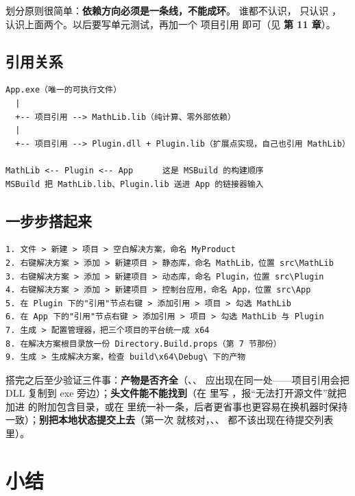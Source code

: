 {{划分原则很简单：\textbf{依赖方向必须是一条线，不能成环}。 谁都不认识， 只认识 ， 认识上面两个。以后要写单元测试，再加一个  项目引用  即可（见 \textbf{第 11 章}）。

\subsection{引用关系}

\begin{lstlisting}[style=textstyle]
App.exe（唯一的可执行文件）
  |
  +-- 项目引用 --> MathLib.lib（纯计算、零外部依赖）
  |
  +-- 项目引用 --> Plugin.dll + Plugin.lib（扩展点实现，自己也引用 MathLib）

MathLib <-- Plugin <-- App      这是 MSBuild 的构建顺序
MSBuild 把 MathLib.lib、Plugin.lib 送进 App 的链接器输入
\end{lstlisting}

\subsection{一步步搭起来}

\begin{lstlisting}[style=textstyle]
1. 文件 > 新建 > 项目 > 空白解决方案，命名 MyProduct
2. 右键解决方案 > 添加 > 新建项目 > 静态库，命名 MathLib，位置 src\MathLib
3. 右键解决方案 > 添加 > 新建项目 > 动态库，命名 Plugin，位置 src\Plugin
4. 右键解决方案 > 添加 > 新建项目 > 控制台应用，命名 App，位置 src\App
5. 在 Plugin 下的"引用"节点右键 > 添加引用 > 项目 > 勾选 MathLib
6. 在 App 下的"引用"节点右键 > 添加引用 > 项目 > 勾选 MathLib 与 Plugin
7. 生成 > 配置管理器，把三个项目的平台统一成 x64
8. 在解决方案根目录放一份 Directory.Build.props（第 7 节那份）
9. 生成 > 生成解决方案，检查 build\x64\Debug\ 下的产物
\end{lstlisting}

搭完之后至少验证三件事：\textbf{产物是否齐全}（、、 应出现在同一处——项目引用会把 DLL 复制到 exe 旁边）；\textbf{头文件能不能找到}（在  里写 ，报“无法打开源文件”就把  加进  的附加包含目录，或在  里统一补一条，后者更省事也更容易在换机器时保持一致）；\textbf{别把本地状态提交上去}（第一次  就核对，、、 都不该出现在待提交列表里）。

\section{小结}

}}

